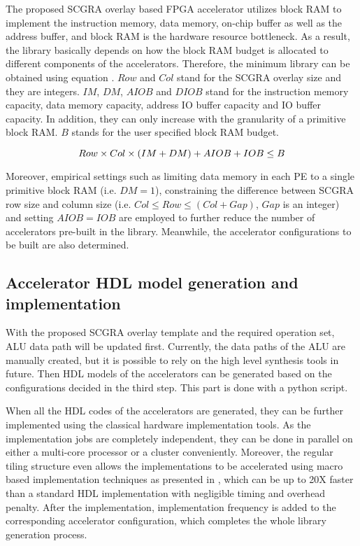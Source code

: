 The proposed SCGRA overlay based FPGA accelerator utilizes block RAM to implement the instruction memory, data memory, on-chip buffer as well as the address buffer, and block RAM is the hardware resource bottleneck. As a result, the library basically depends on how the block RAM budget is allocated to different components of the accelerators. Therefore, the minimum library can be obtained using equation . $Row$ and $Col$ stand for the SCGRA overlay size and they are integers. $IM$, $DM$, $AIOB$ and $DIOB$ stand for the instruction memory capacity, data memory capacity, address IO buffer capacity and IO buffer capacity. In addition, they can only increase with the granularity of a primitive block RAM. $B$ stands for the user specified block RAM budget. 

\begin{equation} \label{eq:lib-gen}
    \footnotesize
    Row \times Col \times(IM + DM) + AIOB + IOB \leq B
\end{equation}

Moreover, empirical settings such as limiting data memory in each PE to a single primitive block RAM
(i.e. $DM = 1$), constraining the difference between SCGRA row size and column size (i.e. $Col \leq
Row \leq (Col + Gap)$, $Gap$ is an integer) and setting $AIOB = IOB$ are employed to further reduce the number of
accelerators pre-built in the library. Meanwhile, the accelerator configurations to be built are also determined.

\subsection{Accelerator HDL model generation and implementation}
With the proposed SCGRA overlay template and the required operation set, ALU data path will be updated first. Currently, the data paths of the ALU are manually created, but it is possible to rely on the high level synthesis tools in future. Then HDL models of the accelerators can be generated based on the configurations decided in the third step. This part is done with a python script. 

When all the HDL codes of the accelerators are generated, they can be further implemented using the classical hardware implementation tools. As the implementation jobs are completely independent, they can be done in parallel on either a multi-core processor or a cluster conveniently. Moreover, the regular tiling structure even allows the implementations to be accelerated using macro based implementation techniques as presented in \cite{ROB2015}, which can be up to 20X faster than a standard HDL implementation with negligible timing and overhead penalty. After the implementation, implementation frequency is added to the corresponding accelerator configuration, which completes the whole library generation process.
